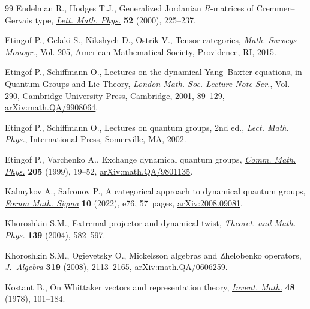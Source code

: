\documentclass[11pt]{article}
\numberwithin{equation}{section}
\begin{document}
\begin{thebibliography}{99}
Endelman R., Hodges T.J., Generalized {J}ordanian {$R$}-matrices of
 {C}remmer--{G}ervais type, \href{https://doi.org/10.1023/A:1007693603336}{\textit{Lett. Math. Phys.}} \textbf{52} (2000),
 225--237.

Etingof P., Gelaki S., Nikshych D., Ostrik V., Tensor categories, \textit{Math.
 Surveys Monogr.}, Vol. 205, \href{https://doi.org/10.1090/surv/205}{American Mathematical Society}, Providence, RI,
 2015.

Etingof P., Schiffmann O., Lectures on the dynamical {Y}ang--{B}axter
 equations, in Quantum {G}roups and {L}ie {T}heory, \textit{London Math. Soc.
 Lecture Note Ser.}, Vol. 290, \href{https://doi.org/10.1017/CBO9780511542848.007}{Cambridge University Press}, Cambridge, 2001,
 89--129, \href{https://arxiv.org/abs/math.QA/9908064}{arXiv:math.QA/9908064}.

Etingof P., Schiffmann O., Lectures on quantum groups, 2nd ed., \textit{Lect. Math. Phys.}, International Press, Somerville, MA, 2002.

Etingof P., Varchenko A., Exchange dynamical quantum groups, \href{https://doi.org/10.1007/s002200050665}{\textit{Comm.
 Math. Phys.}} \textbf{205} (1999), 19--52, \href{https://arxiv.org/abs/math.QA/9801135}{arXiv:math.QA/9801135}.

Kalmykov A., Safronov P., A categorical approach to dynamical quantum groups,
 \href{https://doi.org/10.1017/fms.2022.68}{\textit{Forum Math. Sigma}} \textbf{10} (2022), e76, 57~pages,
 \href{https://arxiv.org/abs/2008.09081}{arXiv:2008.09081}.

Khoroshkin S.M., Extremal projector and dynamical twist, \href{https://doi.org/10.1023/B:TAMP.0000022749.42512.fd}{\textit{Theoret. and
 Math. Phys.}} \textbf{139} (2004), 582--597.

Khoroshkin S.M., Ogievetsky O., Mickelsson algebras and {Z}helobenko operators,
  \href{https://doi.org/10.1016/j.jalgebra.2007.04.020}{\textit{J.~Algebra}} \textbf{319} (2008), 2113--2165,
 \href{https://arxiv.org/abs/math.QA/0606259}{arXiv:math.QA/0606259}.

Kostant B., On {W}hittaker vectors and representation theory, \href{https://doi.org/10.1007/BF01390249}{\textit{Invent.
 Math.}} \textbf{48} (1978), 101--184.


\end{thebibliography}
\end{document}
